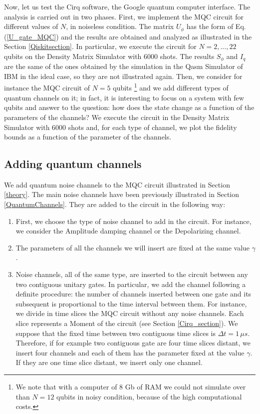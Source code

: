 Now, let us test the Cirq software, the Google quantum computer interface. The analysis is carried out in two phases.
First, we implement the MQC circuit for different values of $N$, in noiseless condition. The matrix  $U_{\phi}$ has the form of Eq. (\ref{U_gate_MQC}) and the results are obtained and analyzed as illustrated in the Section \ref{Qiskitsection}.
In particular, we execute the circuit for $N=2,\dots,22$ qubits on the Density Matrix Simulator with 6000 shots. The results $S_\phi$ and $I_q$ are the same of the ones obtained by the simulation in the Qasm Simulator of IBM in the ideal case, so they are not illustrated again. 
Then, we consider for instance the MQC circuit of $N=5$ qubits  \footnote{We note that with a computer of 8 Gb of RAM we could not simulate over than $N=12$ qubits in noisy condition, because of the high computational costs.} and we add different types of quantum channels on it; in fact, it is interesting to focus on a system with few qubits and answer to the question: how does the state change as a function of the parameters of the channels? 
We execute the circuit in the Density Matrix Simulator with 6000 shots and, for each type of channel, we plot the fidelity bounds as a function of the parameter of the channels.

\subsection{Adding quantum channels}
\label{protocol_insertion}

We add quantum noise channels to the MQC circuit illustrated in Section \ref{theory}. The main noise channels have been previously illustrated in Section \ref{QuantumChannels}. 
They are added to the circuit in the following way:

\begin{enumerate}
\item First, we choose the type of noise channel to add in the circuit. For instance, we consider the Amplitude damping channel or the Depolarizing channel.
\item The parameters of all the channels we will insert are fixed at the same value $\gamma$.
\item  Noise channels, all of the same type, are inserted to the circuit between any two contiguous unitary gates. In particular, we add the channel following a definite procedure: the number of channels inserted between one gate and its subsequent is proportional to the time interval between them. For instance, we divide in time slices the MQC circuit without any noise channels. Each slice represents a Moment of the circuit (see Section \ref{Cirq_section}). We suppose that the fixed time between two contiguous time slices is $\Delta t = 1\, \mu s$. Therefore, if for example two contiguous gate are four time slices distant, we insert four channels and each of them has the parameter fixed at the value $\gamma$. If they are one time slice distant, we insert only one channel.
\end{enumerate}

